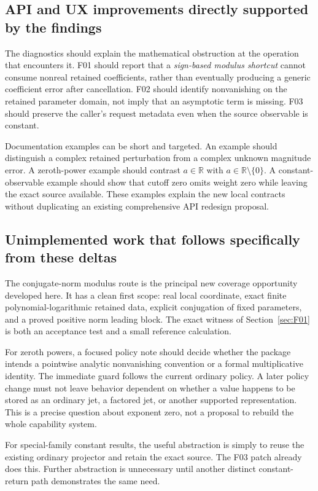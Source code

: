 \documentclass[11pt,letterpaper]{article}
\newcommand{\code}[1]{\texttt{\detokenize{#1}}}
\begin{document}
\subsection{API and UX improvements directly supported by the findings}

The diagnostics should explain the mathematical obstruction at the operation that encounters it. F01 should report that a \emph{sign-based modulus shortcut} cannot consume nonreal retained coefficients, rather than eventually producing a generic coefficient error after cancellation. F02 should identify nonvanishing on the retained parameter domain, not imply that an asymptotic term is missing. F03 should preserve the caller's request metadata even when the source observable is constant.

Documentation examples can be short and targeted. An \code{Abs} example should distinguish a complex retained perturbation from a complex unknown magnitude error. A zeroth-power example should contrast $a\in\mathbb R$ with $a\in\mathbb R\setminus\{0\}$. A constant-observable example should show that cutoff zero omits weight zero while leaving the exact source available. These examples explain the new local contracts without duplicating an existing comprehensive API redesign proposal.

\subsection{Unimplemented work that follows specifically from these deltas}

The conjugate-norm modulus route is the principal new coverage opportunity developed here. It has a clean first scope: real local coordinate, exact finite polynomial-logarithmic retained data, explicit conjugation of fixed parameters, and a proved positive norm leading block. The exact witness of Section~\ref{sec:F01} is both an acceptance test and a small reference calculation.

For zeroth powers, a focused policy note should decide whether the package intends a pointwise analytic nonvanishing convention or a formal multiplicative identity. The immediate guard follows the current ordinary policy. A later policy change must not leave behavior dependent on whether a value happens to be stored as an ordinary jet, a factored jet, or another supported representation. This is a precise question about exponent zero, not a proposal to rebuild the whole capability system.

For special-family constant results, the useful abstraction is simply to reuse the existing ordinary projector and retain the exact source. The F03 patch already does this. Further abstraction is unnecessary until another distinct constant-return path demonstrates the same need.
\end{document}

